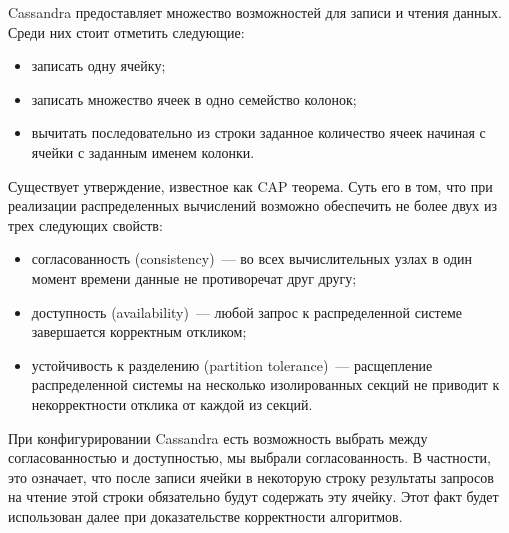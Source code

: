 Cassandra предоставляет множество возможностей для записи и чтения данных. Среди них стоит отметить следующие:

\begin{itemize}
	\item записать одну ячейку;
	\item записать множество ячеек в одно семейство колонок;
	\item вычитать последовательно из строки заданное количество ячеек начиная с ячейки с заданным именем колонки.
\end{itemize}

Существует утверждение, известное как CAP теорема. Суть его в том, что при реализации распределенных вычислений возможно обеспечить не более двух из трех следующих свойств:

\begin{itemize}
	\item согласованность (consistency)~--- во всех вычислительных узлах в один момент времени данные не противоречат друг другу;
	\item доступность (availability)~--- любой запрос к распределенной системе завершается корректным откликом;
	\item устойчивость к разделению (partition tolerance)~--- расщепление распределенной системы на несколько изолированных секций не приводит к некорректности отклика от каждой из секций.
\end{itemize}

При конфигурировании Cassandra есть возможность выбрать между согласованностью и доступностью, мы выбрали согласованность. В частности, это означает, что после записи ячейки в некоторую строку результаты запросов на чтение этой строки обязательно будут содержать эту ячейку. Этот факт будет использован далее при доказательстве корректности алгоритмов.
